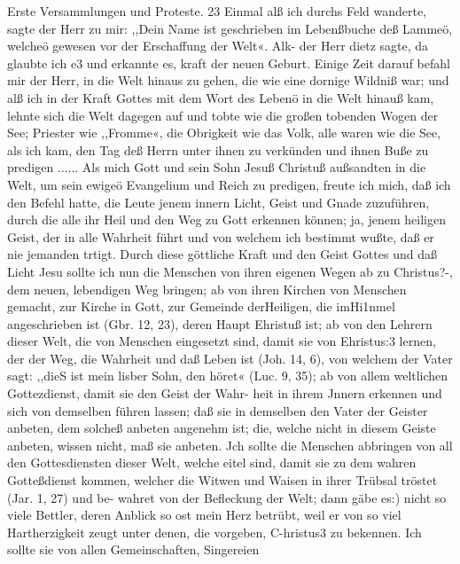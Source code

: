 Erste Versammlungen und Proteste. 23
Einmal alß ich durchs Feld wanderte, sagte der Herr zu mir:
,,Dein Name ist geschrieben im Lebenßbuche deß Lammeö, welcheö
gewesen vor der Erschaffung der Welt«. Alk- der Herr dietz sagte,
da glaubte ich e3 und erkannte es, kraft der neuen Geburt. Einige
Zeit darauf befahl mir der Herr, in die Welt hinaus zu gehen,
die wie eine dornige Wildniß war; und alß ich in der Kraft
Gottes mit dem Wort des Lebenö in die Welt hinauß kam, lehnte
sich die Welt dagegen auf und tobte wie die großen tobenden
Wogen der See; Priester wie ,,Fromme«, die Obrigkeit wie das
Volk, alle waren wie die See, als ich kam, den Tag deß Herrn
unter ihnen zu verkünden und ihnen Buße zu predigen ......
Als mich Gott und sein Sohn Jesuß Christuß außsandten
in die Welt, um sein ewigeö Evangelium und Reich zu predigen,
freute ich mich, daß ich den Befehl hatte, die Leute jenem innern
Licht, Geist und Gnade zuzuführen, durch die alle ihr Heil und
den Weg zu Gott erkennen können; ja, jenem heiligen Geist,
der in alle Wahrheit führt und von welchem ich bestimmt wußte,
daß er nie jemanden trtigt.
Durch diese göttliche Kraft und den Geist Gottes und daß
Licht Jesu sollte ich nun die Menschen von ihren eigenen Wegen
ab zu Christus?-, dem neuen, lebendigen Weg bringen; ab von
ihren Kirchen von Menschen gemacht, zur Kirche in Gott, zur
Gemeinde derHeiligen, die imHi1nmel angeschrieben ist (Gbr. 12, 23),
deren Haupt Ehristuß ist; ab von den Lehrern dieser Welt, die
von Menschen eingesetzt sind, damit sie von Ehristus:3 lernen, der
der Weg, die Wahrheit und daß Leben ist (Joh. 14, 6), von welchem
der Vater sagt: ,,dieS ist mein lisber Sohn, den höret« (Luc. 9, 35);
ab von allem weltlichen Gottezdienst, damit sie den Geist der Wahr-
heit in ihrem Jnnern erkennen und sich von demselben führen
lassen; daß sie in demselben den Vater der Geister anbeten, dem
solcheß anbeten angenehm ist; die, welche nicht in diesem Geiste
anbeten, wissen nicht, maß sie anbeten. Jch sollte die Menschen
abbringen von all den Gottesdiensten dieser Welt, welche eitel
sind, damit sie zu dem wahren Gotteßdienst kommen, welcher die
Witwen und Waisen in ihrer Trübsal tröstet (Jar. 1, 27) und be-
wahret von der Befleckung der Welt; dann gäbe es:) nicht so viele
Bettler, deren Anblick so ost mein Herz betrübt, weil er von so
viel Hartherzigkeit zeugt unter denen, die vorgeben, C-hristus3 zu
bekennen. Ich sollte sie von allen Gemeinschaften, Singereien


